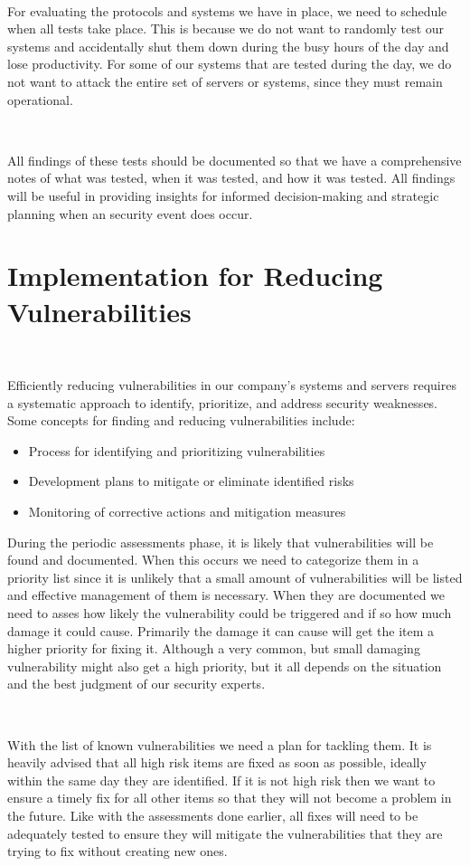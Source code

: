 \documentclass[12pt,a4paper]{report}
\begin{document}
\

For evaluating the protocols and systems we have in place, we need to schedule when all tests take place.
This is because we do not want to randomly test our systems and accidentally shut them down during the busy hours of the day and lose productivity.
For some of our systems that are tested during the day, we do not want to attack the entire set of servers or systems, since they must remain operational.

\

All findings of these tests should be documented so that we have a comprehensive notes of what was tested, when it was tested, and how it was tested.
All findings will be useful in providing insights for informed decision-making and strategic planning when an security event does occur.

\section{Implementation for Reducing Vulnerabilities}
\

Efficiently reducing vulnerabilities in our company's systems and servers requires a systematic approach to identify, prioritize, and address security weaknesses. 
Some concepts for finding and reducing vulnerabilities include:
\begin{itemize}
 \item Process for identifying and prioritizing vulnerabilities
 \item Development plans to mitigate or eliminate identified risks
 \item Monitoring of corrective actions and mitigation measures
\end{itemize}

During the periodic assessments phase, it is likely that vulnerabilities will be found and documented.
When this occurs we need to categorize them in a priority list since it is unlikely that a small amount of vulnerabilities will be listed and effective management of them is necessary.
When they are documented we need to asses how likely the vulnerability could be triggered and if so how much damage it could cause.
Primarily the damage it can cause will get the item a higher priority for fixing it.
Although a very common, but small damaging vulnerability might also get a high priority, but it all depends on the situation and the best judgment of our security experts.

\

With the list of known vulnerabilities we need a plan for tackling them.
It is heavily advised that all high risk items are fixed as soon as possible, ideally within the same day they are identified.
If it is not high risk then we want to ensure a timely fix for all other items so that they will not become a problem in the future.
Like with the assessments done earlier, all fixes will need to be adequately tested to ensure they will mitigate the vulnerabilities that they are trying to fix without creating new ones.
\end{document}
